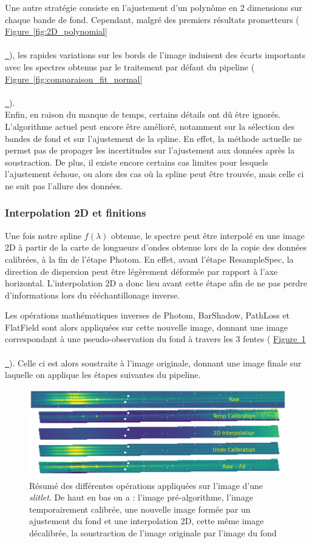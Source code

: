 \documentclass[12pt, a4paper]{article}
\newcommand*{\figref}[2][]{%
  \hyperref[{#2}]{%
    Figure~\ref*{#2}%
    \ifx\\#1\\%
    \else
      \,#1%
    \fi
  }%
}
\begin{document}
Une autre stratégie consiste en l'ajustement d'un polynôme en 2 dimensions sur chaque bande de fond. Cependant, malgré des premiers résultats prometteurs (\figref{fig:2D_polynomial}), les rapides variations sur les bords de l'image induisent des écarts importants avec les spectres obtenus par le traitement par défaut du pipeline (\figref{fig:comparaison_fit_normal}).\\

Enfin, en raison du manque de temps, certains détails ont dû être ignorés. L'algorithme actuel peut encore être amélioré, notamment sur la sélection des bandes de fond et sur l'ajustement de la spline. En effet, la méthode actuelle ne permet pas de propager les incertitudes sur l'ajustement aux données après la soustraction. De plus, il existe encore certains cas limites pour lesquels l'ajustement échoue, ou alors des cas où la spline peut être trouvée, mais celle ci ne suit pas l'allure des données.


\subsubsection{Interpolation 2D et finitions}

Une fois notre spline $f(\lambda)$ obtenue, le spectre peut être interpolé en une image 2D à partir de la carte de longueurs d'ondes obtenue lors de la copie des données calibrées, à la fin de l'étape Photom. En effet, avant l'étape ResampleSpec, la direction de dispersion peut être légèrement déformée par rapport à l'axe horizontal. L'interpolation 2D a donc lieu avant cette étape afin de ne pas perdre d'informations lors du rééchantillonage inverse.

Les opérations mathématiques inverses de Photom, BarShadow, PathLoss et FlatField sont alors appliquées sur cette nouvelle image, donnant une image correspondant à une pseudo-observation du fond à travers les 3 fentes (\figref{fig:background}). Celle ci est alors soustraite à l'image originale, donnant une image finale sur laquelle on applique les étapes suivantes du pipeline.

\begin{figure}[H]
  \centering
  \includegraphics[scale=0.5]{assets/background_subtraction.png}
  \caption{Résumé des différentes opérations appliquées sur l'image d'une \textit{slitlet}. De haut en bas on a : l'image pré-algorithme, l'image temporairement calibrée, une nouvelle image formée par un ajustement du fond et une interpolation 2D, cette même image décalibrée, la soustraction de l'image originale par l'image du fond}
  \label{fig:background}
\end{figure}
\end{document}
